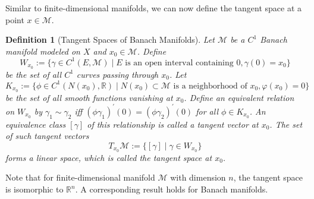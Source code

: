 \documentclass[12pt]{amsart}
\numberwithin{equation}{section}
\newtheorem{definition}{Definition}[section]
\theoremstyle{remark}
\newcommand{\lt}[1]{\texttt{\color{blue} TL: \footnotesize #1}}
\newcommand{\cjp}[1]{{\color{orange} CJ: \footnotesize #1}}
\begin{document}
Similar to finite-dimensional manifolds, we can now define the tangent space at a point $x\in \mathcal M$.





\begin{definition}[Tangent Spaces of Banach Manifolds]
Let $\mathcal M$ be a $C^1$ Banach manifold modeled on $X$ and $x_0\in \mathcal M$. Define
\begin{equation}
    W_{x_0}:=\{\gamma \in C^1( E, \mathcal M) \mid E \text{ is an open interval containing } 0, \gamma(0)= x_0  \}
\end{equation}
be the set of all $C^1$ curves passing through $x_0$.  Let
\begin{equation}
    K_{x_0}:=\{\phi\in C^1(N(x_0),\mathbb R)\mid N(x_0) \subset \mathcal M \text{ is a neighborhood of } x_0, \varphi(x_0)=0\}
\end{equation}
be the set of all smooth functions vanishing at $x_0$. Define an equivalent relation on $W_{x_0}$ by $\gamma_1 \sim \gamma_2$ iff $(\phi\gamma_1)^\prime (0) = (\phi\gamma_2)^\prime (0)$ for all $\phi \in K_{x_0}$. An equivalence class $[\gamma]$ of this relationship is called a tangent vector at $x_0$. The set of such tangent vectors
\begin{equation}
    T_{x_0}\mathcal M:=\{[\gamma]\mid \gamma\in W_{x_0}\}
\end{equation}
forms a linear space, which is called the tangent space at $x_0$.
\end{definition}

Note that for finite-dimensional manifold $\mathcal M$ with dimension $n$,
the tangent space is isomorphic to $\mathbb R^n$. A corresponding result holds for Banach manifolds.
\end{document}
